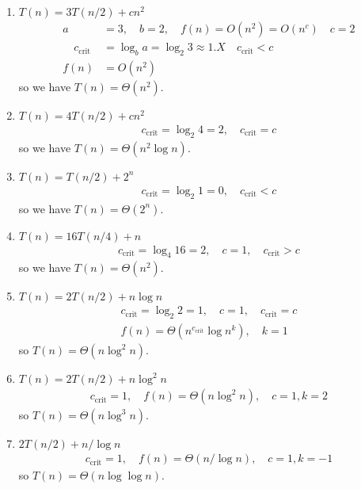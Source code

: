 \documentclass[../main.tex]{subfiles}
\begin{document}
\begin{enumerate}
    \item $T (n) = 3 T(n/2) + cn^2$
    \begin{align*}
        a &=3, \quad b = 2, \quad f(n) = O(n^2) = O(n^c) \quad c = 2 \\
        \quad c_\text{crit} &= \log_b{a} = \log_2{3} \approx 1.X \quad c_\text{crit} < c \\
        f(n) &= O(n^2)
    \end{align*}
    so we have $T(n) = \Theta(n^2)$.

    \item $T(n) = 4 T(n/2) + cn^2$
    \begin{align*}
        c_\text{crit} = \log_2{4} = 2, \quad c_\text{crit} = c
    \end{align*}
    so we have $T(n) = \Theta(n^2 \log{n})$.

    \item $T(n) = T(n/2) + 2^n$
    \begin{align*}
        c_\text{crit} = \log_2{1} = 0, \quad c_\text{crit} < c
    \end{align*}
    so we have $T(n) = \Theta(2^n)$.

    \item $T(n) = 16 T(n/4) + n$
    \begin{align*}
        c_\text{crit} = \log_4{16} = 2, \quad c = 1, \quad c_\text{crit} > c
    \end{align*}
    so we have $T(n) = \Theta(n^2)$.

    \item $T(n) = 2 T(n/2) + n \log{n}$
    \begin{align*}
        c_\text{crit} = \log_2{2} = 1, \quad c = 1, \quad c_\text{crit} = c \\
        f(n) = \Theta(n^{c_\text{crit}} \log{n}^k), \quad k = 1
    \end{align*}
    so $T(n) = \Theta(n \log^2{n})$.

    \item $T(n) = 2T(n/2) + n \log^2 n$ 
    \begin{align*}
        c_\text{crit} = 1, \quad f(n) = \Theta(n \log^2 n), \quad c = 1, k = 2
    \end{align*}
    so $T(n) = \Theta(n \log^3 n)$.
    
    \item $2 T(n/2) + n / \log n$
    \begin{align*}
        c_\text{crit} = 1, \quad f(n) = \Theta(n / \log n), \quad c = 1, k = -1
    \end{align*}
    so $T(n) = \Theta(n \log \log n)$.


\end{enumerate}
\end{document}
